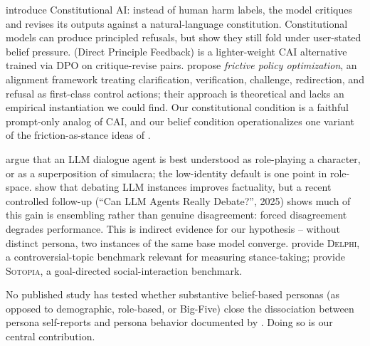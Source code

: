  \citet{bai2022constitutional} introduce Constitutional AI: instead of human harm labels, the model critiques and revises its outputs against a natural-language constitution. Constitutional models can produce principled refusals, but \citet{sharma2023sycophancy} show they still fold under user-stated belief pressure. \citet{huang2024pinkelephants} (Direct Principle Feedback) is a lighter-weight CAI alternative trained via DPO on critique-revise pairs. \citet{pustejovsky2026frictive} propose \emph{frictive policy optimization}, an alignment framework treating clarification, verification, challenge, redirection, and refusal as first-class control actions; their approach is theoretical and lacks an empirical instantiation we could find. Our constitutional condition is a faithful prompt-only analog of CAI, and our belief condition operationalizes one variant of the friction-as-stance ideas of \citet{pustejovsky2026frictive}.

 \citet{shanahan2023roleplay} argue that an LLM dialogue agent is best understood as role-playing a character, or as a superposition of simulacra; the low-identity default is one point in role-space. \citet{du2023debate} show that debating LLM instances improves factuality, but a recent controlled follow-up (``Can LLM Agents Really Debate?'', 2025) shows much of this gain is ensembling rather than genuine disagreement: forced disagreement degrades performance. This is indirect evidence for our hypothesis -- without distinct persona, two instances of the same base model converge. \citet{sun2023delphi} provide \textsc{Delphi}, a controversial-topic benchmark relevant for measuring stance-taking; \citet{zhou2023sotopia} provide \textsc{Sotopia}, a goal-directed social-interaction benchmark.

 No published study has tested whether substantive belief-based personas (as opposed to demographic, role-based, or Big-Five) close the dissociation between persona self-reports and persona behavior documented by \citet{han2025personality}. Doing so is our central contribution.
